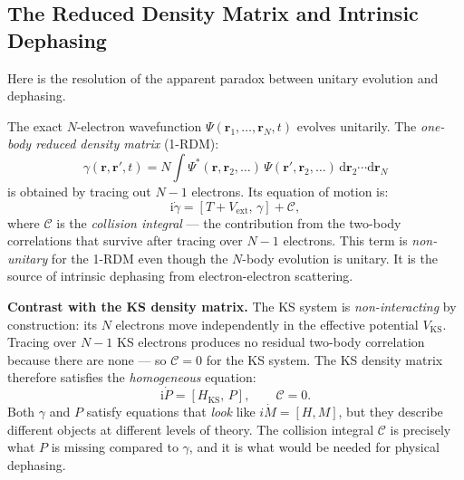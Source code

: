 \documentclass[12pt,letterpaper]{article}
\newcommand{\comm}[2]{\left[#1,\,#2\right]}
\newcommand{\dd}{\mathrm{d}}
\newcommand{\ii}{\mathrm{i}}
\newcommand{\Hks}{H_{\mathrm{KS}}}
\theoremstyle{definition}
\begin{document}
\subsection{The Reduced Density Matrix and Intrinsic Dephasing}

Here is the resolution of the apparent paradox between unitary evolution
and dephasing.

The exact $N$-electron wavefunction $\Psi(\bm{r}_1,\ldots,\bm{r}_N,t)$
evolves unitarily.  The \emph{one-body reduced density matrix} (1-RDM):
\begin{equation}
  \gamma(\bm{r},\bm{r}',t) = N\int\!\Psi^*(\bm{r},\bm{r}_2,\ldots)\,
  \Psi(\bm{r}',\bm{r}_2,\ldots)\,\dd\bm{r}_2\cdots\dd\bm{r}_N
  \label{eq:1rdm}
\end{equation}
is obtained by tracing out $N-1$ electrons.  Its equation of motion is:
\begin{equation}
  \ii\dot{\gamma} = \comm{T + V_{\mathrm{ext}}}{\gamma} + \mathcal{C},
  \label{eq:1rdm_eom}
\end{equation}
where $\mathcal{C}$ is the \emph{collision integral} --- the contribution
from the two-body correlations that survive after tracing over $N-1$
electrons.  This term is \emph{non-unitary} for the 1-RDM even though
the $N$-body evolution is unitary.  It is the source of intrinsic
dephasing from electron-electron scattering.

\textbf{Contrast with the KS density matrix.}
The KS system is \emph{non-interacting} by construction: its $N$ electrons
move independently in the effective potential $V_\text{KS}$.
Tracing over $N-1$ KS electrons produces no residual two-body correlation
because there are none --- so $\mathcal{C}=0$ for the KS system.
The KS density matrix therefore satisfies the \emph{homogeneous} equation:
\begin{equation}
  \ii\dot{P} = \comm{\Hks}{P}, \qquad \mathcal{C} = 0.
\end{equation}
Both $\gamma$ and $P$ satisfy equations that \emph{look} like $i\dot{M}=[H,M]$,
but they describe different objects at different levels of theory.
The collision integral $\mathcal{C}$ is precisely what $P$ is missing
compared to $\gamma$, and it is what would be needed for physical dephasing.
\end{document}
